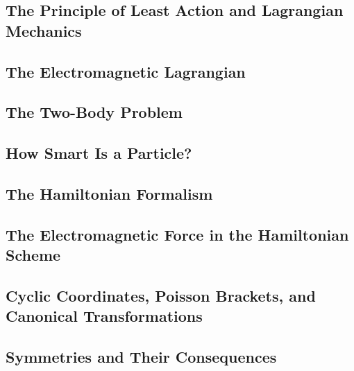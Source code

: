 \subsection{The Principle of Least Action and Lagrangian Mechanics}

\subsection{The Electromagnetic Lagrangian}

\subsection{The Two-Body Problem}

\subsection{How Smart Is a Particle?}

\subsection{The Hamiltonian Formalism}

\subsection{The Electromagnetic Force in the Hamiltonian Scheme}

\subsection{Cyclic Coordinates, Poisson Brackets, and Canonical Transformations}

\subsection{Symmetries and Their Consequences}
